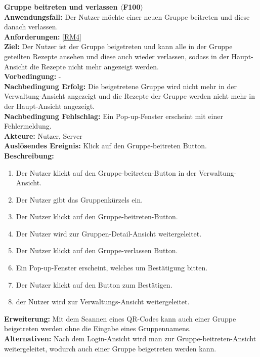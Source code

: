 \documentclass[parskip=full]{scrartcl}
\begin{document}
\textbf{Gruppe beitreten und verlassen $\langle$F100$\rangle$}\\
\textbf{Anwendungsfall:} Der Nutzer möchte einer neuen Gruppe beitreten und diese danach verlassen.\\
\textbf{Anforderungen:} \ref{RM4} \\
\textbf{Ziel:} Der Nutzer ist der Gruppe beigetreten und kann alle in der Gruppe geteilten Rezepte ansehen und diese auch wieder verlassen, sodass in der Haupt-Ansicht die Rezepte nicht mehr angezeigt werden.\\
\textbf{Vorbedingung:} -\\
\textbf{Nachbedingung Erfolg:} Die beigetretene Gruppe wird nicht mehr in der Verwaltung-Ansicht angezeigt und die Rezepte der Gruppe werden nicht mehr in der Haupt-Ansicht angezeigt.\\
\textbf{Nachbedingung Fehlschlag:} Ein Pop-up-Fenster erscheint mit einer Fehlermeldung.\\
\textbf{Akteure:} Nutzer, Server\\
\textbf{Auslösendes Ereignis:} Klick auf den Gruppe-beitreten Button.\\
\textbf{Beschreibung:}\\
\begin{enumerate}
    \item Der Nutzer klickt auf den Gruppe-beitreten-Button in der Verwaltung-Ansicht.
    \item Der Nutzer gibt das Gruppenkürzels ein.
    \item Der Nutzer klickt auf den Gruppe-beitreten-Button.
    \item Der Nutzer wird zur Gruppen-Detail-Ansicht weitergeleitet.
    \item Der Nutzer klickt auf den Gruppe-verlassen Button.
    \item Ein Pop-up-Fenster erscheint, welches um Bestätigung bitten.
    \item Der Nutzer klickt auf den Button zum Bestätigen.
    \item der Nutzer wird zur Verwaltungs-Ansicht weitergeleitet.
\end{enumerate}
\textbf{Erweiterung:} Mit dem Scannen eines QR-Codes kann auch einer Gruppe beigetreten werden ohne die Eingabe eines Gruppennamens.\\
\textbf{Alternativen:} Nach dem Login-Ansicht wird man zur Gruppe-beitreten-Ansicht weitergeleitet, wodurch auch einer Gruppe beigetreten werden kann.\\
\newpage
\end{document}
